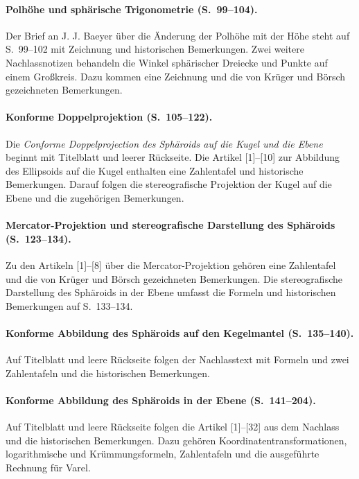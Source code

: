 \paragraph{Polhöhe und sphärische Trigonometrie (S.~99--104).}
Der Brief an J. J. Baeyer über die Änderung der Polhöhe mit der Höhe steht auf S.~99--102 mit Zeichnung und historischen Bemerkungen. Zwei weitere Nachlassnotizen behandeln die Winkel sphärischer Dreiecke und Punkte auf einem Großkreis. Dazu kommen eine Zeichnung und die von Krüger und Börsch gezeichneten Bemerkungen.

\paragraph{Konforme Doppelprojektion (S.~105--122).}
Die \textit{Conforme Doppelprojection des Sphäroids auf die Kugel und die Ebene} beginnt mit Titelblatt und leerer Rückseite. Die Artikel [1]--[10] zur Abbildung des Ellipsoids auf die Kugel enthalten eine Zahlentafel und historische Bemerkungen. Darauf folgen die stereografische Projektion der Kugel auf die Ebene und die zugehörigen Bemerkungen.

\paragraph{Mercator-Projektion und stereografische Darstellung des Sphäroids (S.~123--134).}
Zu den Artikeln [1]--[8] über die Mercator-Projektion gehören eine Zahlentafel und die von Krüger und Börsch gezeichneten Bemerkungen. Die stereografische Darstellung des Sphäroids in der Ebene umfasst die Formeln und historischen Bemerkungen auf S.~133--134.

\paragraph{Konforme Abbildung des Sphäroids auf den Kegelmantel (S.~135--140).}
Auf Titelblatt und leere Rückseite folgen der Nachlasstext mit Formeln und zwei Zahlentafeln und die historischen Bemerkungen.

\paragraph{Konforme Abbildung des Sphäroids in der Ebene (S.~141--204).}
Auf Titelblatt und leere Rückseite folgen die Artikel [1]--[32] aus dem Nachlass und die historischen Bemerkungen. Dazu gehören Koordinatentransformationen, logarithmische und Krümmungsformeln, Zahlentafeln und die ausgeführte Rechnung für Varel.

